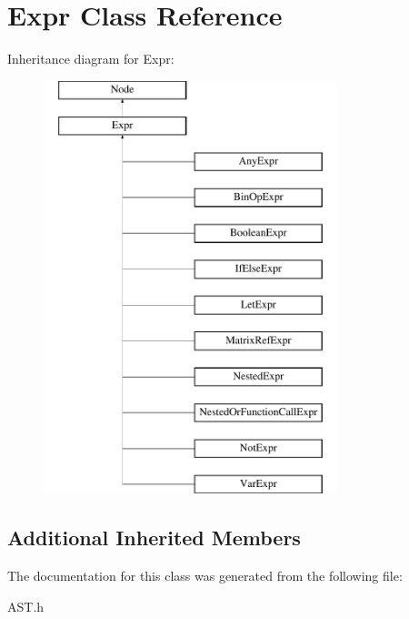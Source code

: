 \hypertarget{classExpr}{\section{Expr Class Reference}
\label{classExpr}
}
Inheritance diagram for Expr\-:\begin{figure}[H]
\begin{center}
\leavevmode
\includegraphics[height=12.000000cm]{classExpr}
\end{center}
\end{figure}
\subsection*{Additional Inherited Members}


The documentation for this class was generated from the following file\-:\begin{DoxyCompactItemize}
\item 
A\-S\-T.\-h\end{DoxyCompactItemize}
